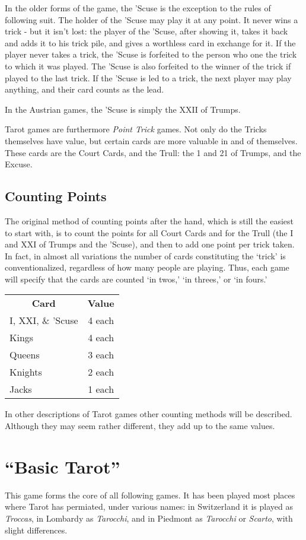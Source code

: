 \documentclass[ebook,12pt,twoside,openright,extrafontsizes,final]{memoir}
\begin{document}
In the older forms of the game, the ’Scuse is the exception to the rules of
following suit.  The holder of the ’Scuse may play it at any point. It never
wins a trick - but it isn’t lost: the player of the ’Scuse, after showing it,
takes it back and adds it to his trick pile, and gives a worthless card in
exchange for it.  If the player never takes a trick, the ’Scuse is forfeited
to the person who one the trick to which it was played.  The ’Scuse is also
forfeited to the winner of the trick if played to the last trick.  If the 
’Scuse is led to a trick, the next player may play anything, and their card
counts as the lead.

In the Austrian games, the ’Scuse is simply the XXII of Trumps.

Tarot games are furthermore \emph{Point Trick} games.  Not only do the Tricks
themselves have value, but certain cards are more valuable in and of themselves.
These cards are the Court Cards, and the Trull: the 1 and 21 of Trumps,
and the Excuse.


\section{Counting Points}
The original method of counting points after the hand, which is still the easiest
to start with, is to count the points for all Court Cards and for the Trull (the I
and XXI of Trumps and the ’Scuse), and then to add one point per trick taken.  In 
fact, in almost all variations the number of cards constituting the ‘trick’ is 
conventionalized, regardless of how many people are playing. Thus, each game will 
specify that the cards are counted ‘in twos,’ ‘in threes,’ or ‘in fours.’

\begin{table}[]
\centering
\begin{tabular}{lc}
\multicolumn{1}{c}{\textbf{Card}} & \textbf{Value} \\
I, XXI, \& ’Scuse & 4 each\\
Kings & 4 each \\
Queens & 3 each\\
Knights & 2 each\\
Jacks & 1 each
\end{tabular}
\end{table}

In other descriptions of Tarot games other counting methods will be described. Although
they may seem rather different, they add up to the same values.

\chapter{“Basic Tarot”}
This game forms the core of all following games. It has been played most 
places where Tarot has permiated, under various names: in Switzerland
it is played as \emph{Troccas}, in Lombardy as \emph{Tarocchi}, and in Piedmont
as \emph{Tarocchi} or \emph{Scarto}, with slight differences.
\end{document}
